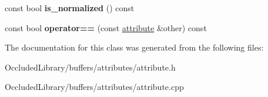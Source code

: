 \begin{DoxyCompactItemize}
\item 
\hypertarget{classoccluded_1_1buffers_1_1attributes_1_1attribute_a53b604a3b38c68892bb8691f89dd78dd}{const bool {\bfseries is\+\_\+normalized} () const }\label{classoccluded_1_1buffers_1_1attributes_1_1attribute_a53b604a3b38c68892bb8691f89dd78dd}

\item 
\hypertarget{classoccluded_1_1buffers_1_1attributes_1_1attribute_a4e5897c884ac34635613576b633189e7}{const bool {\bfseries operator==} (const \hyperlink{classoccluded_1_1buffers_1_1attributes_1_1attribute}{attribute} \&other) const }\label{classoccluded_1_1buffers_1_1attributes_1_1attribute_a4e5897c884ac34635613576b633189e7}

\end{DoxyCompactItemize}


The documentation for this class was generated from the following files\+:\begin{DoxyCompactItemize}
\item 
Occluded\+Library/buffers/attributes/attribute.\+h\item 
Occluded\+Library/buffers/attributes/attribute.\+cpp\end{DoxyCompactItemize}
